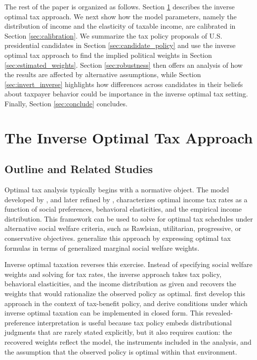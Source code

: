 \documentclass[12pt]{article}
\begin{document}
The rest of the paper is organized as follows. Section \ref{sec:approach} describes the inverse optimal tax approach. We next show how the model parameters, namely the distribution of income and the elasticity of taxable income, are calibrated in Section \ref{sec:calibration}. We summarize the tax policy proposals of U.S. presidential candidates in Section \ref{sec:candidate_policy} and use the inverse optimal tax approach to find the implied political weights in Section \ref{sec:estimated_weights}. Section \ref{sec:robustness} then offers an analysis of how the results are affected by alternative assumptions, while Section \ref{sec:invert_inverse} highlights how differences across candidates in their beliefs about taxpayer behavior could be importance in the inverse optimal tax setting. Finally, Section \ref{sec:conclude} concludes.

\section{The Inverse Optimal Tax Approach}
\label{sec:approach}

\subsection{Outline and Related Studies}

Optimal tax analysis typically begins with a normative object.  The model developed by \citet{DM1971}, and later refined by \citet{Saez2001}, characterizes optimal income tax rates as a function of social preferences, behavioral elasticities, and the empirical income distribution.  This framework can be used to solve for optimal tax schedules under alternative social welfare criteria, such as Rawlsian, utilitarian, progressive, or conservative objectives.  \citet{SS2016} generalize this approach by expressing optimal tax formulas in terms of generalized marginal social welfare weights.

Inverse optimal taxation reverses this exercise.  Instead of specifying social welfare weights and solving for tax rates, the inverse approach takes tax policy, behavioral elasticities, and the income distribution as given and recovers the weights that would rationalize the observed policy as optimal.  \citet{BS2012} first develop this approach in the context of tax-benefit policy, and \citet{TH2017} derive conditions under which inverse optimal taxation can be implemented in closed form.  This revealed-preference interpretation is useful because tax policy embeds distributional judgments that are rarely stated explicitly, but it also requires caution: the recovered weights reflect the model, the instruments included in the analysis, and the assumption that the observed policy is optimal within that environment.
\end{document}
